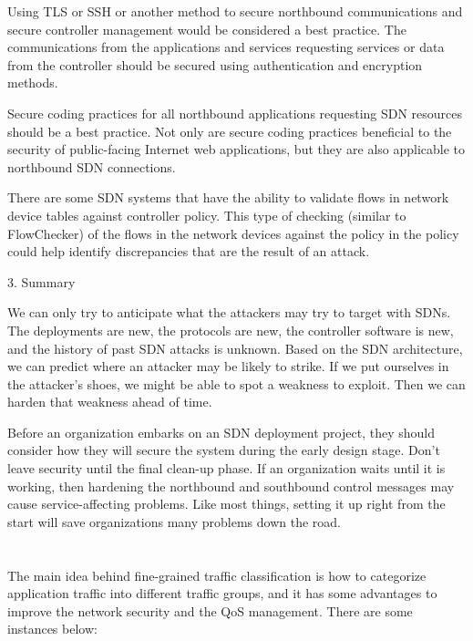 Using TLS or SSH or another method to secure northbound communications and secure controller management would be considered a best practice.  The communications from the applications and services requesting services or data from the controller should be secured using authentication and encryption methods.

Secure coding practices for all northbound applications requesting SDN resources should be a best practice.  Not only are secure coding practices beneficial to the security of public-facing Internet web applications, but they are also applicable to northbound SDN connections.

There are some SDN systems that have the ability to validate flows in network device tables against controller policy.  This type of checking (similar to FlowChecker) of the flows in the network devices against the policy in the policy could help identify discrepancies that are the result of an attack.

3. Summary

We can only try to anticipate what the attackers may try to target with SDNs.  The deployments are new, the protocols are new, the controller software is new, and the history of past SDN attacks is unknown.  Based on the SDN architecture, we can predict where an attacker may be likely to strike.  If we put ourselves in the attacker’s shoes, we might be able to spot a weakness to exploit.  Then we can harden that weakness ahead of time.

Before an organization embarks on an SDN deployment project, they should consider how they will secure the system during the early design stage.  Don’t leave security until the final clean-up phase.  If an organization waits until it is working, then hardening the northbound and southbound control messages may cause service-affecting problems.  Like most things, setting it up right from the start will save organizations many problems down the road.\cite{SSAV_NWW}






\section{}
\label{sec:grained}
The main idea behind fine-grained traffic classification is how to categorize application traffic into different traffic groups, and it has some advantages to improve the network security and the QoS management. There are some instances below:

